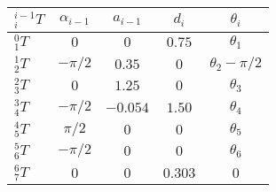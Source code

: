 \documentclass[12pt]{article}
\begin{document}

\begin{center}
\renewcommand{\arraystretch}{1.4}
\begin{tabular}{ l c c c c }
\hline
$^{i-1}_{i}T$ & $\alpha_{i-1}$ & $a_{i-1}$ & $d_{i}$ & $\theta_{i}$ \\ 
\hline\hline
$^{0}_{1}T$   & $0$            & $0$       & $0.75$  & $\theta_{1}$         \\  
$^{1}_{2}T$   & $-\pi/2$       & $0.35$    & $0$     & $\theta_{2} - \pi/2$ \\  
$^{2}_{3}T$   & $0$            & $1.25$    & $0$     & $\theta_{3}$         \\  
$^{3}_{4}T$   & $-\pi/2$       & $-0.054$  & $1.50$  & $\theta_{4}$         \\  
$^{4}_{5}T$   & $ \pi/2$       & $0$       & $0$     & $\theta_{5}$         \\  
$^{5}_{6}T$   & $-\pi/2$       & $0$       & $0$     & $\theta_{6}$         \\  
$^{6}_{7}T$   & $0$            & $0$       & $0.303$ & $0$                  \\  
\hline
\end{tabular}
\end{center}
\end{document}
